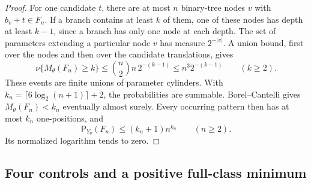 \documentclass[11pt,reqno]{amsart}
\numberwithin{equation}{section}
\theoremstyle{definition}
\theoremstyle{definition}
\newcommand{\Patt}{\mathsf P}
\begin{document}
\begin{proof}
For one candidate $t$, there are at most $n$ binary-tree nodes $v$
with $b_v+t\in F_n$. If a branch contains at least $k$ of them,
one of these nodes has depth at least $k-1$, since a branch has
only one node at each depth. The set of parameters extending a
particular node $v$ has measure $2^{-|v|}$. A union bound, first
over the nodes and then over the candidate translations, gives
\[
 \nu\{M_\theta(F_n)\ge k\}
 \le \binom n2 n\,2^{-(k-1)}
 \le n^3 2^{-(k-1)}\qquad(k\ge2).
\]
These events are finite unions of parameter cylinders. With
$k_n=\lceil6\log_2(n+1)\rceil+2$, the probabilities are summable.
Borel--Cantelli gives $M_\theta(F_n)<k_n$ eventually almost surely.
Every occurring pattern then has at most $k_n$ one-positions, and
\[
 \Patt_{Y_\theta}(F_n)\le(k_n+1)n^{k_n}\qquad(n\ge2).
\]
Its normalized logarithm tends to zero.
\end{proof}

\subsection{Four controls and a positive full-class minimum}
\end{document}
